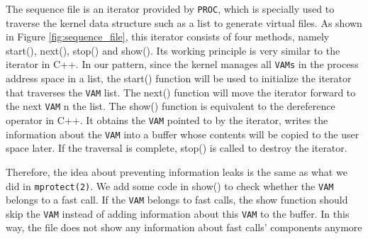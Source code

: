 The sequence file is an iterator provided by \verb|PROC|, which is 
specially used to traverse the kernel data structure such as a 
list to generate virtual files. As shown in Figure \ref{fig:sequence_file}, this 
iterator consists of four methods, namely start(), next(), 
stop() and show(). Its working principle is very similar to 
the iterator in C++. In our pattern, since the kernel manages 
all \verb|VAMs| in the process address space in a list, the start() 
function will be used to initialize the iterator that traverses 
the \verb|VAM| list. The next() function will move the iterator forward 
to the next \verb|VAM|  n the list. The show() function is equivalent to 
the dereference operator in C++. It obtains the \verb|VAM| pointed to by 
the iterator, writes the information about the \verb|VAM| into a buffer 
whose contents will be copied to the user space later. If the 
traversal is complete, stop() is called to destroy the iterator.

Therefore, the idea about preventing information leaks is the
 same as what we did in \verb|mprotect(2)|. We add some code in show() to 
 check whether the \verb|VAM| belongs to a fast call.  If the \verb|VAM| 
 belongs to fast calls, the show function should skip the \verb|VAM| 
 instead of adding information about this \verb|VAM| to the buffer. 
 In this way, the file does not show any information about 
 fast calls' components anymore



\cleardoublepage




